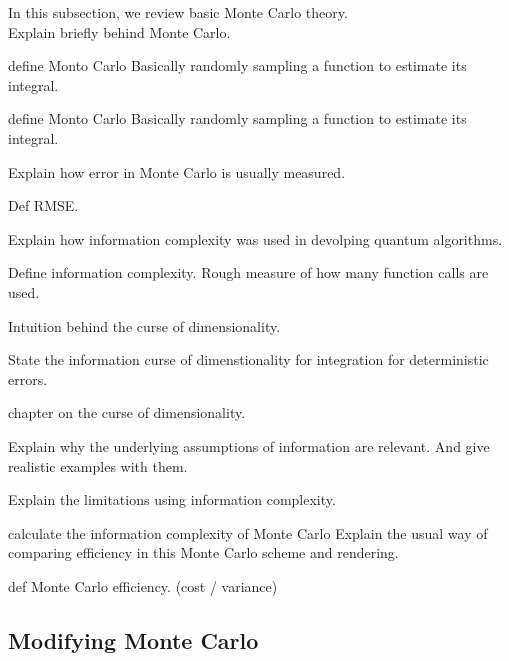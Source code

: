 \documentclass[a4paper,12pt]{article}
\begin{document}
In this subsection, we review basic Monte Carlo theory. \\

Explain briefly behind Monte Carlo.
\begin{definition}
    define Monto Carlo
    Basically randomly sampling a function to estimate its integral.
\end{definition}

\begin{definition}
    define Monto Carlo
    Basically randomly sampling a function to estimate its integral.
\end{definition}

Explain how error in Monte Carlo is usually measured.
\begin{definition}
    Def RMSE.
\end{definition}

Explain how information complexity was used in devolping quantum algorithms.
\begin{definition}
    Define information complexity.
    Rough measure of how many function calls are used.
\end{definition}

Intuition behind the curse of dimensionality.

\begin{theorem}
    State the information curse of dimenstionality for integration for
    deterministic errors.
\end{theorem}

\begin{related}
    \cite{foucart_mathematical_2022} chapter on the curse of dimensionality.
\end{related}

Explain why the underlying assumptions of information are relevant.
And give realistic examples with them.

Explain the limitations using information complexity.

calculate the information complexity of Monte Carlo
Explain the usual way of comparing efficiency in this Monte Carlo scheme
and rendering.
\begin{definition}
    def Monte Carlo efficiency. (cost / variance)
\end{definition}

\subsection{Modifying Monte Carlo}
\end{document}
